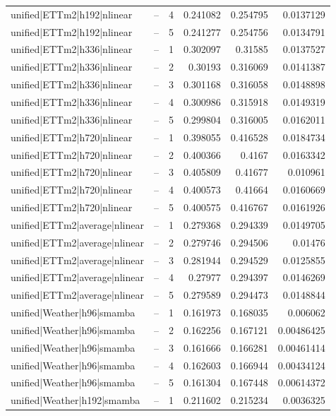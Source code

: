 \begin{longtable}{llrrrr}
unified|ETTm2|h192|nlinear & -- & 4 & 0.241082 & 0.254795 & 0.0137129 \\
unified|ETTm2|h192|nlinear & -- & 5 & 0.241277 & 0.254756 & 0.0134791 \\
unified|ETTm2|h336|nlinear & -- & 1 & 0.302097 & 0.31585 & 0.0137527 \\
unified|ETTm2|h336|nlinear & -- & 2 & 0.30193 & 0.316069 & 0.0141387 \\
unified|ETTm2|h336|nlinear & -- & 3 & 0.301168 & 0.316058 & 0.0148898 \\
unified|ETTm2|h336|nlinear & -- & 4 & 0.300986 & 0.315918 & 0.0149319 \\
unified|ETTm2|h336|nlinear & -- & 5 & 0.299804 & 0.316005 & 0.0162011 \\
unified|ETTm2|h720|nlinear & -- & 1 & 0.398055 & 0.416528 & 0.0184734 \\
unified|ETTm2|h720|nlinear & -- & 2 & 0.400366 & 0.4167 & 0.0163342 \\
unified|ETTm2|h720|nlinear & -- & 3 & 0.405809 & 0.41677 & 0.010961 \\
unified|ETTm2|h720|nlinear & -- & 4 & 0.400573 & 0.41664 & 0.0160669 \\
unified|ETTm2|h720|nlinear & -- & 5 & 0.400575 & 0.416767 & 0.0161926 \\
unified|ETTm2|average|nlinear & -- & 1 & 0.279368 & 0.294339 & 0.0149705 \\
unified|ETTm2|average|nlinear & -- & 2 & 0.279746 & 0.294506 & 0.01476 \\
unified|ETTm2|average|nlinear & -- & 3 & 0.281944 & 0.294529 & 0.0125855 \\
unified|ETTm2|average|nlinear & -- & 4 & 0.27977 & 0.294397 & 0.0146269 \\
unified|ETTm2|average|nlinear & -- & 5 & 0.279589 & 0.294473 & 0.0148844 \\
unified|Weather|h96|smamba & -- & 1 & 0.161973 & 0.168035 & 0.006062 \\
unified|Weather|h96|smamba & -- & 2 & 0.162256 & 0.167121 & 0.00486425 \\
unified|Weather|h96|smamba & -- & 3 & 0.161666 & 0.166281 & 0.00461414 \\
unified|Weather|h96|smamba & -- & 4 & 0.162603 & 0.166944 & 0.00434124 \\
unified|Weather|h96|smamba & -- & 5 & 0.161304 & 0.167448 & 0.00614372 \\
unified|Weather|h192|smamba & -- & 1 & 0.211602 & 0.215234 & 0.0036325 \\

\end{longtable}
